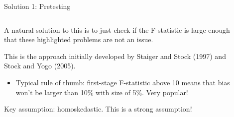 \documentclass[notes,11pt, aspectratio=169]{beamer}
\newenvironment{wideitemize}{\itemize\addtolength{\itemsep}{10pt}}{\enditemize}
\begin{document}
\begin{frame}{Solution 1: Pretesting}
  \begin{columns}[T] %
    \begin{column}{0.5\textwidth}
      \begin{wideitemize}
      \item A natural solution to this is to just check if the F-statistic is large enough that these highlighted problems are not an issue.
      \item This is the approach initially developed by Staiger and Stock
        (1997) and Stock and Yogo (2005).
        \begin{itemize}
        \item Typical rule of thumb: first-stage F-statistic above 10 means that bias won't be larger than 10\% with size of 5\%. Very popular!
        \end{itemize}
      \item Key assumption: homoskedastic. This is a strong assumption!
      \end{wideitemize}
    \end{column}
    \begin{column}{0.5\textwidth}
    \end{column}
  \end{columns}
\end{frame}
\end{document}
